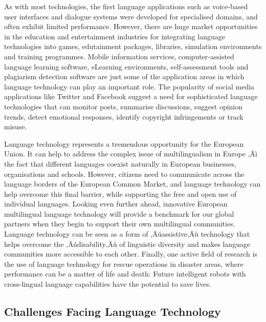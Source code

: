 \begin{multicols}{2}
As with most technologies, the first language applications such as voice-based user interfaces and dialogue systems were developed for specialised domains, and often exhibit limited performance. However, there are huge market opportunities in the education and entertainment industries for integrating language technologies into games, edutainment packages, libraries, simulation environments and training programmes. Mobile information services, computer-assisted language learning software, eLearning environments, self-assessment tools and plagiarism detection software are just some of the application areas in which language technology can play an important role. The popularity of social media applications like Twitter and Facebook suggest a need for sophisticated language technologies that can monitor posts, summarise discussions, suggest opinion trends, detect emotional responses, identify copyright infringements or track misuse.


Language technology represents a tremendous opportunity for the
European Union. It can help to address the complex issue of
multilingualism in Europe ‚Äì the fact that different languages coexist
naturally in European businesses, organisations and schools. However,
citizens need to communicate across the language borders of the
European Common Market, and language technology can help overcome this
final barrier, while supporting the free and open use of individual
languages. Looking even further ahead, innovative European
multilingual language technology will provide a benchmark for our
global partners when they begin to support their own multilingual
communities. Language technology can be seen as a form of ‚Äúassistive‚Äù
technology that helps overcome the ‚Äúdisability‚Äù of linguistic
diversity and makes language communities more accessible to each
other. Finally, one active field of research is the use of language
technology for rescue operations in disaster areas, where performance
can be a matter of life and death: Future intelligent robots with
cross-lingual language capabilities have the potential to save lives.

\subsection{Challenges Facing Language Technology}


\end{multicols}
